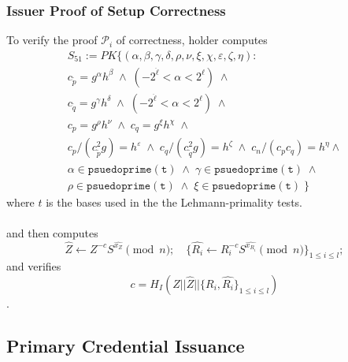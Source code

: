 \subsubsection{Issuer Proof of Setup Correctness}

To verify the proof $\mathcal{P}_i$ of correctness, holder
computes
\begin{align}
S_{51} := PK\{(\alpha,\beta,\gamma,\delta,\rho,\nu,\xi,\chi,\varepsilon,\zeta,\eta):\\
c_{\tilde{p}} = g^{\alpha}h^{\beta} \; \land \; (-2^{\ddot{\ell}} < \alpha < 2^{\ell}) \; \land \\
c_{\tilde{q}} = g^{\gamma}h^{\delta} \; \land \; (-2^{\ddot{\ell}} < \alpha < 2^{\ell}) \; \land \\
c_p = g^{\rho}h^{\nu} \; \land \; c_q = g^{\xi}h^{\chi} \; \land \\
c_p/(c_{\tilde{p}}^2g) = h^{\varepsilon} \; \land \; c_q/(c_{\tilde{q}}^2g) = h^{\zeta} \; \land \; c_n/(c_p c_q) = h^{\eta} \land \\
\alpha \in \mathtt{psuedoprime(t)} \; \land \; \gamma \in \mathtt{psuedoprime(t)} \; \land \\
\rho \in \mathtt{psuedoprime(t)} \; \land \; \xi \in \mathtt{psuedoprime(t)} \;
\}
\end{align}
where $t$ is the bases used in the  the Lehmann-primality tests. 
\\\\and then computes
$$
\widehat{Z} \leftarrow Z^{-c} S^{\widehat{x_Z}}\pmod{n} ;\quad  \{\widehat{R_i} 
\leftarrow R_i^{-c} S^{\widehat{x_{R_i}}}\pmod{n}\}_{1\leq i \leq l};
$$
and verifies 
$$
c =  H_I(Z||\widehat{Z}||\{R_i,\widehat{R_i}\}_{1\leq i \leq l})
$$.


\subsection{Primary Credential Issuance}
\begin{comment}
\begin{enumerate}
    \item Retrieve the current  value $\mathrm{acc}$ for accumulator $A_{R_i}$ and the  set $V$ of issued and non-revoked credential numbers.
    \item $H()$ is a hash function where the output length is 256 bits.
    \item $||$ denotes concatenation.
    \item $U_i$ is the identifier of the user $i$.
    \item Compute $$
\overline{S} = A_{R_i}||U_i,\quad H_{\overline{S}} = H(\overline{S})
$$ 
and sets $m_2 = H_{\overline{S}}$.
    \item Create 256-bit integer attributes $\{m_i\}_{i \in A_k}$ for the holder.
    \item Generate 80-bit nonce $n_0$ and send to the holder.
\end{enumerate}
Holder:

\end{comment}


